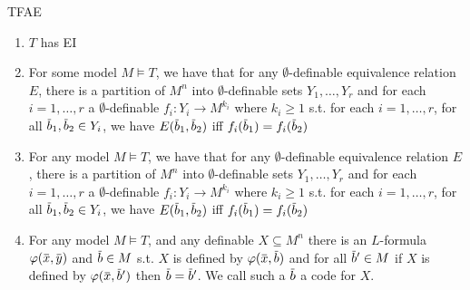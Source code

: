 \documentclass[11pt]{article}
\begin{document}
\begin{proposition}[]
\label{P2.41}
TFAE
\begin{enumerate}
\item \(T\) has EI
\item For some model \(M\vDash T\), we have that for any \(\emptyset\)-definable equivalence relation \(E\),
there is a partition of \(M^n\) into \(\emptyset\)-definable sets \(Y_1,\dots,Y_r\) and for each \(i=1,\dots,r\)
a \(\emptyset\)-definable \(f_i:Y_i\to M^{k_i}\) where \(k_i\ge 1\) s.t. for each \(i=1,\dots,r\), for
all \(\barb_1,\barb_2\in Y_i\), we have \(E(\barb_1,\barb_2)\) iff \(f_i(\barb_1)=f_i(\barb_2)\)
\item For any model \(M\vDash T\), we have that for any \(\emptyset\)-definable equivalence relation \(E\),
there is a partition of \(M^n\) into \(\emptyset\)-definable sets \(Y_1,\dots,Y_r\) and for each \(i=1,\dots,r\)
a \(\emptyset\)-definable \(f_i:Y_i\to M^{k_i}\) where \(k_i\ge 1\) s.t. for each \(i=1,\dots,r\), for
all \(\barb_1,\barb_2\in Y_i\), we have \(E(\barb_1,\barb_2)\) iff \(f_i(\barb_1)=f_i(\barb_2)\)
\item For any model \(M\vDash T\), and any definable \(X\subseteq M^n\) there is
an \(L\)-formula \(\varphi(\barx,\bary)\) and \(\barb\in M\) s.t. \(X\) is defined by \(\varphi(\barx,\barb)\)
and for all \(\barb'\in M\) if \(X\) is defined by \(\varphi(\barx,\barb')\) then \(\barb=\barb'\).
We call such a \(\barb\) a code for \(X\).
\end{enumerate}
\end{proposition}

\end{document}
